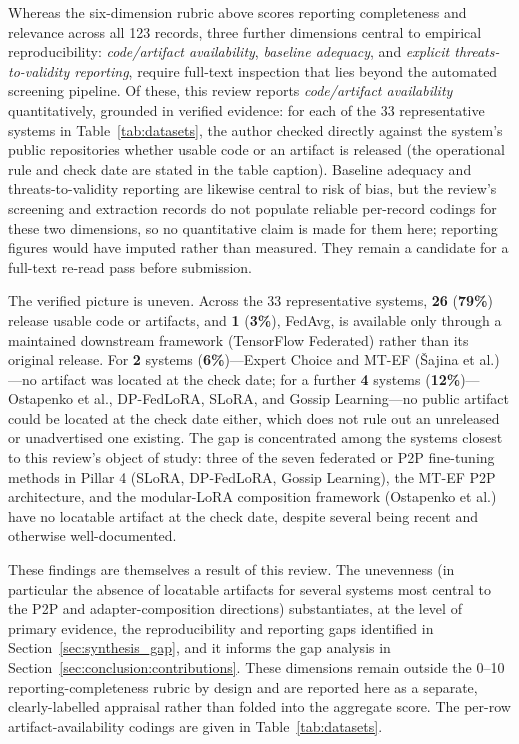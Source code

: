 Whereas the six-dimension rubric above scores reporting completeness and
relevance across all 123 records, three further dimensions central to
empirical reproducibility: \emph{code/artifact availability}, \emph{baseline
adequacy}, and \emph{explicit threats-to-validity reporting}, require
full-text inspection that lies beyond the automated screening pipeline. Of
these, this review reports \emph{code/artifact availability} quantitatively,
grounded in verified evidence: for each of the 33 representative systems in
Table~\ref{tab:datasets}, the author checked directly against the system's
public repositories whether usable code or an artifact is released (the
operational rule and check date are stated in the table caption). Baseline
adequacy and threats-to-validity reporting are likewise central to risk of
bias, but the review's screening and extraction records do not populate
reliable per-record codings for these two dimensions, so no quantitative claim
is made for them here; reporting figures would have imputed rather than
measured. They remain a candidate for a full-text re-read pass before
submission.

The verified picture is uneven. Across the 33 representative systems,
\textbf{26} (\textbf{79\%}) release usable code or artifacts, and \textbf{1}
(\textbf{3\%}), FedAvg, is available only through a maintained downstream
framework (TensorFlow Federated) rather than its original release. For
\textbf{2} systems (\textbf{6\%})---Expert Choice and MT-EF
({\v{S}}ajina et al.)---no artifact was located at the check date; for a further
\textbf{4} systems (\textbf{12\%})---Ostapenko et al., DP-FedLoRA, SLoRA, and
Gossip Learning---no public artifact could be located at the check date
either, which does not rule out an unreleased or unadvertised one existing. The gap is concentrated among the systems closest to this
review's object of study: three of the seven federated or P2P fine-tuning
methods in Pillar 4 (SLoRA, DP-FedLoRA, Gossip Learning), the MT-EF P2P architecture, and
the modular-LoRA composition framework (Ostapenko et al.) have no locatable
artifact at the check date, despite several being recent and otherwise well-documented.

These findings are themselves a result of this review. The unevenness (in
particular the absence of locatable artifacts for several systems most central
to the P2P and adapter-composition directions) substantiates, at the level of
primary evidence, the reproducibility and reporting gaps identified in
Section~\ref{sec:synthesis_gap}, and it informs the gap analysis in
Section~\ref{sec:conclusion:contributions}. These dimensions remain outside the
0--10 reporting-completeness rubric by design and are reported here as a
separate, clearly-labelled appraisal rather than folded into the aggregate
score. The per-row artifact-availability codings are given in
Table~\ref{tab:datasets}.
